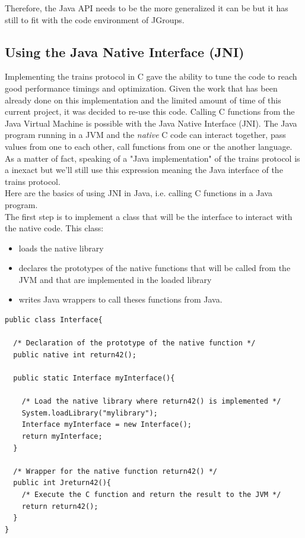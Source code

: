 \documentclass[a4paper,10pt]{report}
\begin{document}
Therefore, the Java API needs to be the more generalized it can be but it has still to fit with the code environment of JGroups.

\subsection{Using the Java Native Interface (JNI)}

Implementing the trains protocol in C gave the ability to tune the code to reach good performance timings and optimization.
Given the work that has been already done on this implementation and the limited amount of time of this current project, 
it was decided to re-use this code. Calling C functions from the Java Virtual Machine is possible with the Java Native Interface (JNI).
The Java program running in a JVM and the \textit{native} C code can interact together, pass values from one to each other, call functions from one or the another
language. As a matter of fact, speaking of a "Java implementation" of the trains protocol is a inexact but we'll still use this expression
meaning the Java interface of the trains protocol.\\

Here are the basics of using JNI in Java, i.e. calling C functions in a Java program.\\

The first step is to implement a class that will be the interface to interact with the native code. This class:
\begin{itemize}
  \item loads the native library
  \item declares the prototypes of the native functions that will be called from the JVM and that are implemented in the loaded library
   \item writes Java wrappers to call theses functions from Java.\\
\end{itemize}

\lstset{language=java}
\lstset{commentstyle=\textit} 
\begin{lstlisting}
public class Interface{

  /* Declaration of the prototype of the native function */
  public native int return42();

  public static Interface myInterface(){

    /* Load the native library where return42() is implemented */
    System.loadLibrary("mylibrary");
    Interface myInterface = new Interface();
    return myInterface;
  }

  /* Wrapper for the native function return42() */
  public int Jreturn42(){
    /* Execute the C function and return the result to the JVM */
    return return42();
  }
}
\end{lstlisting}
\end{document}
